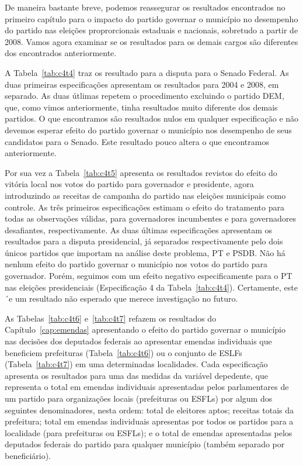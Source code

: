 De maneira bastante breve, podemos reassegurar os resultados encontrados no primeiro capítulo para o impacto do partido governar o município no desempenho do partido nas eleições proprorcionais estaduais e nacionais, sobretudo a partir de 2008. Vamos agora examinar se os resultados para os demais cargos são diferentes dos encontrados anteriormente.




A Tabela~\ref{tab:c4t4} traz os resultado para a disputa para o Senado Federal. As duas primeiras especificações apresentam os resultados para 2004 e 2008, em separado. As duas útlimas repetem o procedimento excluindo o partido DEM, que, como vimos anteriormente, tinha resultados muito diferente dos demais partidos. O que encontramos são resultados nulos em qualquer especificação e não devemos esperar efeito do partido governar o município nos desempenho de seus candidatos para o Senado. Este resultado pouco altera o que encontramos anteriormente.

Por sua vez a Tabela~\ref{tab:c4t5} apresenta os resultados revistos do efeito do vitória local nos votos do partido para governador e presidente, agora introduzindo as receitas de campanha do partido nas eleições municipais como controle. As três primeiros especificações estimam o efeito do tratamento para todas as observações válidas, para governadores incumbentes e para governadores desafiantes, respectivamente. As duas últimas especificações apresentam os resultados para a disputa presidencial, já separados respectivamente pelo dois únicos partidos que importam na análise deste problema, PT e PSDB. Não há nenhum efeito do partido governar o município nos votos do partido para governador. Porém, seguimos com um efeito negativo especificamente para o PT nas eleições presidenciais (Especificação 4 da Tabela~\ref{tab:c4t4}). Certamente, este ´e um resultado não esperado que merece investigação no futuro.

As Tabelas~\ref{tab:c4t6} e~\ref{tab:c4t7} refazem os resultados do Capítulo~\ref{cap:emendas} apresentando o efeito do partido governar o município nas decisões dos deputados federais ao apresentar emendas individuais que beneficiem prefeituras (Tabela~\ref{tab:c4t6}) ou o conjunto de ESLFs (Tabela~\ref{tab:c4t7}) em uma determinadas localidades. Cada especificação apresenta os resultados para uma das medidas da variável depedente, que representa o total em emendas individuais apresentadas pelos parlamentares de um partido para organizações locais (prefeituras ou ESFLs) por algum dos seguintes denominadores, nesta ordem: total de eleitores aptos; receitas totais da prefeitura; total em emendas individuais apresentas por todos os partidos para a localidade (para prefeituras ou ESFLs); e o total de emendas apresentadas pelos deputados federais do partido para qualquer município (também separado por beneficiário).

